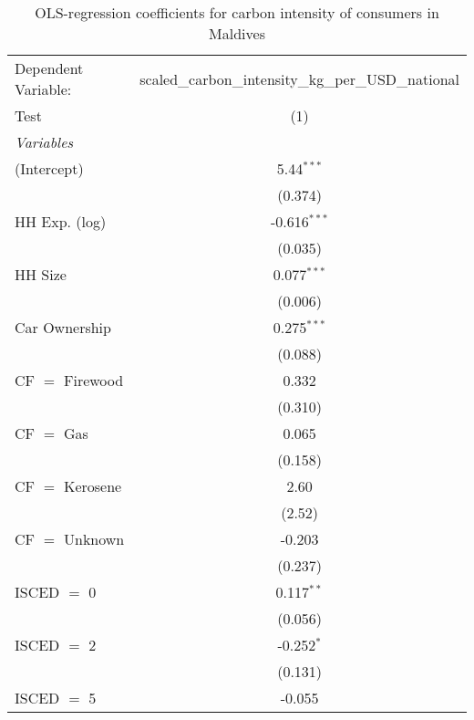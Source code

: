 
\begin{table}[htbp!]
   \centering
   \small
   \begin{adjustbox}{width = 1\textwidth, max height = 0.95\textheight, center}
      \begin{threeparttable}[b]
         \caption{\label{tab:OLS_1_MDV} OLS-regression coefficients for carbon intensity of consumers in Maldives}
         \begin{tabular}{lc}
            \tabularnewline \midrule \midrule
            Dependent Variable: & scaled\_carbon\_intensity\_kg\_per\_USD\_national\\        
            Test                & (1)\\  
            \midrule
            \emph{Variables}\\
            (Intercept)         & 5.44$^{***}$\\   
                                & (0.374)\\   
            HH Exp. (log)       & -0.616$^{***}$\\   
                                & (0.035)\\   
            HH Size             & 0.077$^{***}$\\   
                                & (0.006)\\   
            Car Ownership       & 0.275$^{***}$\\   
                                & (0.088)\\   
            CF $=$ Firewood     & 0.332\\   
                                & (0.310)\\   
            CF $=$ Gas          & 0.065\\   
                                & (0.158)\\   
            CF $=$ Kerosene     & 2.60\\   
                                & (2.52)\\   
            CF $=$ Unknown      & -0.203\\   
                                & (0.237)\\   
            ISCED $=$ 0         & 0.117$^{**}$\\   
                                & (0.056)\\   
            ISCED $=$ 2         & -0.252$^{*}$\\   
                                & (0.131)\\   
            ISCED $=$ 5         & -0.055\\   

\end{tabular}
\end{threeparttable}
\end{adjustbox}
\end{table}
